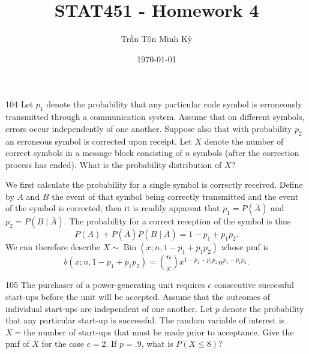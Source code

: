 \documentclass{exam}
\title{STAT451 - Homework 4}
\author{\foreignlanguage{vietnamese}{Trần Tôn Minh Kỳ}}
\date{\today}
\DeclareMathOperator{\Bin}{Bin}
\begin{document}
\maketitle
\begin{problem}{104}
	Let $p_1$ denote the probability that any particular code symbol is erroneously transmitted through a communication system. Assume that on different symbols, errors occur independently of one another. Suppose also that with probability $p_2$ an erroneous symbol is corrected upon receipt. Let $X$ denote the number of correct symbols in a message block consisting of $n$ symbols (after the correction process has ended). What is the probability distribution of $X$?
\end{problem}

We first calculate the probability for a single symbol is correctly received. Define by $A$ and $B$ the event of that symbol being correctly transmitted and the event of the symbol is corrected; then it is readily apparent that $p_1 = P(\overline A)$ and $p_2 = P(B \mid \overline A)$. The probability for a correct reception of the symbol is thus
\[
	P(A) + P(\overline A)P(B \mid \overline A) = 1 - p_1 + p_1p_2.
\]
We can therefore describe $X \sim \Bin(x; n, 1 - p_1 + p_1p_2)$ whose pmf is
\[
	b(x; n, 1 - p_1 + p_1p_2) = \binom nx x^{1 - p_1 + p_1p_2} n^{p_1 - p_1p_2}.
\]

\begin{problem}{105}
	The purchaser of a power-generating unit requires $c$ consecutive successful start-ups before the unit will be accepted. Assume that the outcomes of individual start-ups are independent of one another. Let $p$ denote the probability that any particular start-up is successful. The random variable of interest is $X = \text{the number of start-ups that must be made prior to acceptance}$. Give the pmf of $X$ for the case $c = 2$. If $p = .9$, what is $P(X \le 8)$?
\end{problem}
\end{document}
